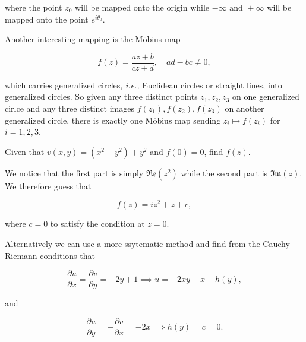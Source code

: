 \documentclass[english,a4paper,12pt]{report}
\begin{document}
where the point \(z_0 \) will be mapped onto the origin while \(-\infty \text { and } + \infty\) will be mapped onto the point \(e^{i \theta _{0} } \).  

Another interesting mapping is the Möbius map

\begin{equation}
    f(z) = \frac{az+b}{cz+d}, \quad ad-bc \neq 0,
\end{equation}

which carries generalized circles, \textit{i.e.,} Euclidean circles or straight lines, into generalized circles. So given any three distinct points \(z_1 ,z_2, z_3 \) on one generalized cirlce and any three distinct images \(f(z_1 ), f(z_2 ), f(z_3 )\) on another generalized circle, there is exactly one Möbius map sending \(z_{i} \mapsto f(z_{i} ) \) for \(i = 1,2,3\).    

{Given that \(v(x,y)  = (x^2-y^2) + y^2\) and \(f(0)=0\), find \(f(z)\).  }
{We notice that the first part is simply \(\mathfrak{Re} (z^2) \) while the second part is \(\mathfrak{Im} (z) \). We therefore guess that 

\begin{equation}
    f(z) = iz^2+z+c, 
\end{equation}

where \(c = 0\) to satisfy the condition at \(z = 0\).

Alternatively we can use a more ssytematic method and find from the Cauchy-Riemann conditions that 

\begin{equation}
    \frac{\partial u}{\partial x} = \frac{\partial v}{\partial y} = -2y+1 \implies u = -2xy+x+h(y),
\end{equation}

and 

\begin{equation}
    \frac{\partial u}{\partial y} = -\frac{\partial v}{\partial x} = -2x \implies h(y) = c = 0.
\end{equation}
~
} 
\end{document}
